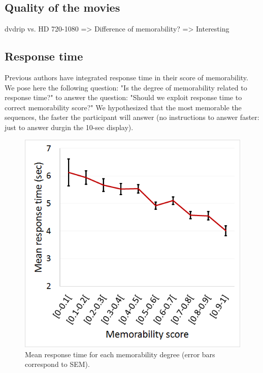 \documentclass[sigconf]{acmart}
\begin{document}
\subsection{Quality of the movies}
dvdrip vs. HD 720-1080 => Difference of memorability? => Interesting

\subsection{Response time}
Previous authors have integrated response time in their score of memorability. We pose here the following question: "Is the degree of memorability related to response time?" to answer the question: "Should we exploit response time to correct memorability score?" We hypothesized that the most memorable the sequences, the faster the participant will answer (no instructions to answer faster: just to answer durgin the 10-sec display).

\begin{figure}[!htbp]
	\centering
	\includegraphics[width=\columnwidth]{figures/Response_time_vs_Memorability.png}
	\caption{\label{fig:response_time_vs_memorability}Mean response time for each memorability degree (error bars correspond to SEM).}
\end{figure}
\end{document}
